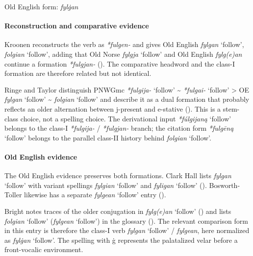 \documentclass[
  british,
  a4paper,
]{article}
\providecommand{\Recon}[1]{\emph{*#1}}
\begin{document}
Old English form: \emph{fylġan}

\paragraph{Reconstruction and comparative
evidence}\label{reconstruction-and-comparative-evidence-89}

Kroonen reconstructs the verb as \emph{*fulgen-} and gives Old English
{\emph{fylgan}} `follow', {\emph{folgian}} `follow', adding that Old
Norse {\emph{fylgja}} `follow' and Old English {\emph{fylg(e)an}}
continue a formation \emph{*fulgjan-}
(). The comparative
headword and the class-I formation are therefore related but not
identical.

Ringe and Taylor distinguish PNWGmc \Recon{fulgija-} `follow'
\textasciitilde{} \Recon{fulgai-} `follow' \textgreater{} OE
{\emph{fylgan}} `follow' \textasciitilde{} {\emph{folgian}} `follow' and
describe it as a dual formation that probably reflects an older
alternation between j-present and e-stative
(). This
is a stem-class choice, not a spelling choice. The derivational input
\Recon{fúlgijaną} `follow' belongs to the class-I \emph{*fulgija-} /
\emph{*fulgjan-} branch; the citation form \Recon{fulgēną} `follow'
belongs to the parallel class-II history behind {\emph{folgian}}
`follow'.

\paragraph{Old English evidence}\label{old-english-evidence-89}

The Old English evidence preserves both formations. Clark Hall lists
{\emph{fylgan}} `follow' with variant spellings {\emph{fylgian}}
`follow' and {\emph{fyligan}} `follow'
(). Bosworth-Toller
likewise has a separate {\emph{fylgean}} `follow' entry
().

Bright notes traces of the older conjugation in {\emph{fylg(e)an}}
`follow' () and
lists {\emph{folgian}} `follow' ({\emph{fylgean}} `follow') in the
glossary ().
The relevant comparison form in this entry is therefore the class-I verb
{\emph{fylgan}} `follow' / {\emph{fylgean}}, here normalized as
{\emph{fylġan}} `follow'. The spelling with ġ represents the palatalized
velar before a front-vocalic environment.
\end{document}
